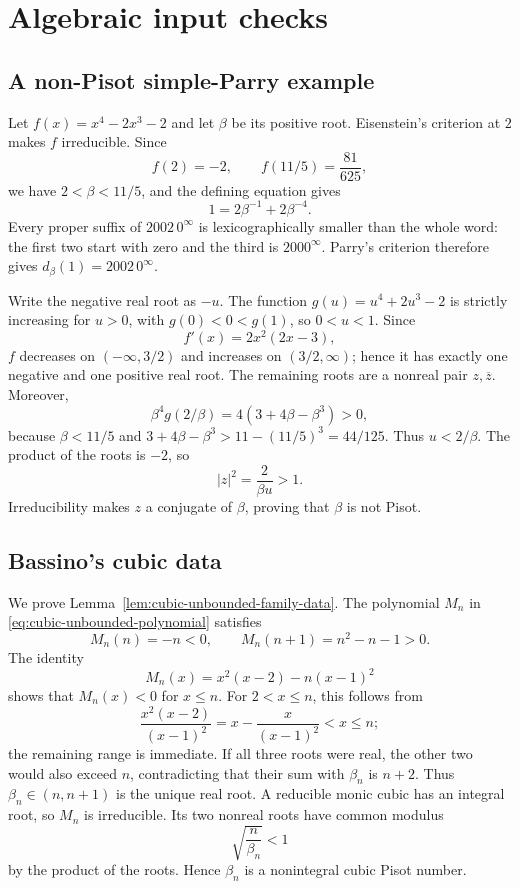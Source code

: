 \section{Algebraic input checks}
\label{app:algebraic-inputs}

\subsection{A non-Pisot simple-Parry example}
\label{app:quartic-nonpisot}

Let $f(x)=x^4-2x^3-2$ and let $\beta$ be its positive root.  Eisenstein's
criterion at $2$ makes $f$ irreducible.  Since
\[
f(2)=-2,
\qquad
f(11/5)=\frac{81}{625},
\]
we have $2<\beta<11/5$, and the defining equation gives
\[
1=2\beta^{-1}+2\beta^{-4}.
\]
Every proper suffix of $2002\,0^\infty$ is lexicographically smaller than
the whole word: the first two start with zero and the third is
$2000^\infty$.  Parry's criterion therefore gives
$d_\beta(1)=2002\,0^\infty$.

Write the negative real root as $-u$.  The function
$g(u)=u^4+2u^3-2$ is strictly increasing for $u>0$, with $g(0)<0<g(1)$,
so $0<u<1$.  Since
\[
f'(x)=2x^2(2x-3),
\]
$f$ decreases on $(-\infty,3/2)$ and increases on $(3/2,\infty)$; hence it
has exactly one negative and one positive real root.  The remaining roots
are a nonreal pair $z,\overline z$.  Moreover,
\[
\beta^4g(2/\beta)=4(3+4\beta-\beta^3)>0,
\]
because $\beta<11/5$ and
$3+4\beta-\beta^3>11-(11/5)^3=44/125$.  Thus $u<2/\beta$.  The product of
the roots is $-2$, so
\[
|z|^2=\frac{2}{\beta u}>1.
\]
Irreducibility makes $z$ a conjugate of $\beta$, proving that $\beta$ is
not Pisot.

\subsection{Bassino's cubic data}
\label{app:bassino-data}

We prove Lemma~\ref{lem:cubic-unbounded-family-data}.  The polynomial
$M_n$ in \eqref{eq:cubic-unbounded-polynomial} satisfies
\[
M_n(n)=-n<0,
\qquad
M_n(n+1)=n^2-n-1>0.
\]
The identity
\[
M_n(x)=x^2(x-2)-n(x-1)^2
\]
shows that $M_n(x)<0$ for $x\le n$.  For $2<x\le n$, this follows from
\[
\frac{x^2(x-2)}{(x-1)^2}=x-\frac{x}{(x-1)^2}<x\le n;
\]
the remaining range is immediate.  If all three roots were real, the other
two would also exceed $n$, contradicting that their sum with $\beta_n$ is
$n+2$.  Thus $\beta_n\in(n,n+1)$ is the unique real root.  A reducible
monic cubic has an integral root, so $M_n$ is irreducible.  Its two nonreal
roots have common modulus
\[
\sqrt{\frac n{\beta_n}}<1
\]
by the product of the roots.  Hence $\beta_n$ is a nonintegral cubic Pisot
number.

